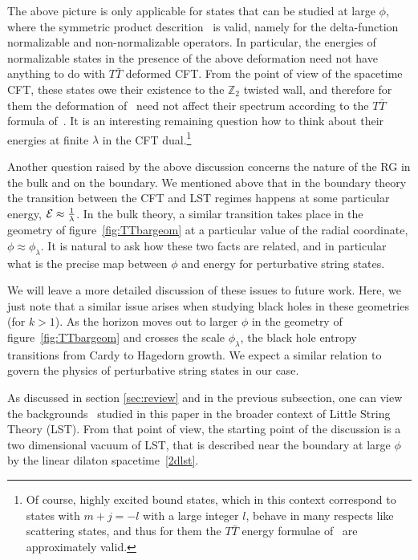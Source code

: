 \documentclass[12pt]{article}
\newcommand{\bZ}{{\mathbb Z}}
\numberwithin{equation}{section}
\begin{document}
The above picture is only applicable for states that can be studied at large $\phi$, where the symmetric product descrition \ourcft\ is valid, namely for the delta-function normalizable and non-normalizable operators. In particular, the energies of normalizable states in the presence of the above deformation need not have anything to do with $T\bar T$ deformed CFT. From the point of view of the spacetime CFT, these states owe their existence to the $\bZ_2$ twisted wall, and therefore for them the deformation of~ need not affect their spectrum according to the $T\bar T$ formula of~. It is an interesting remaining question how to think about their energies at finite $\lambda$ in the CFT dual.\footnote{Of course, highly excited bound states, which in this context correspond to states with $m+j=-l$ with a large integer $l$, behave in many respects like scattering states, and thus for them the $T\bar T$ energy formulae of~ are approximately valid.} 

Another question raised by the above discussion concerns the nature of the RG in the bulk and on the boundary. We mentioned above that in the boundary theory the transition between the CFT and LST regimes happens at some particular energy, $\mathcal {E}\approx\frac1\lambda$. In the bulk theory, a similar transition takes place in the geometry of figure~\ref{fig:TTbargeom} at a particular value of the radial coordinate, $\phi\approx\phi_\lambda$. It is natural to ask how these two facts are related, and in particular what is the precise map between $\phi$ and energy for perturbative string states. 

We will leave a more detailed discussion of these issues to future work. Here, we just note that a similar issue arises when studying black holes in these geometries (for $k>1$).  As the horizon moves out to larger $\phi$ in the geometry of figure~\ref{fig:TTbargeom} and crosses the scale $\phi_\lambda$, the black hole entropy transitions from Cardy to Hagedorn growth.  We expect a similar relation to govern the physics of perturbative string states in our case. 





\label{sec:LSTinterp}

As discussed in section \ref{sec:review} and in the previous subsection, one can view the backgrounds \ourads\ studied in this paper in the broader context of Little String Theory (LST). From that point of view, the starting point of the discussion is a two dimensional vacuum of LST, that is described near the boundary at large $\phi$ by the linear dilaton spacetime~\eqref{2dlst}. 
\end{document}
